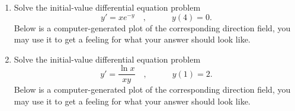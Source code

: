 \begin{enumerate}
\item Solve the initial-value differential equation problem
\[
y'=xe^{-y}
\quad,\quad  \quad \quad y(4)=0.
\]
Below is a computer-generated plot of the corresponding direction field, you may use it to get a feeling for what your answer should look like.


\item Solve the initial-value differential equation problem
\[
y'=\frac{\ln x}{x y}
\quad,\quad  \quad \quad y(1)=2.
\]
Below is a computer-generated plot of the corresponding direction field, you may use it to get a feeling for what your answer should look like.

\end{enumerate}
